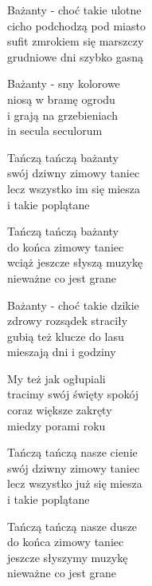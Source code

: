 \begin{text}
    Bażanty - choć takie ulotne\\
    cicho podchodzą pod miasto\\
    sufit zmrokiem się marszczy\\
    grudniowe dni szybko gasną

    Bażanty - sny kolorowe\\
    niosą w bramę ogrodu\\
    i grają na grzebieniach\\
    in secula seculorum

    Tańczą tańczą bażanty\\
    swój dziwny zimowy taniec\\
    lecz wszystko im się miesza\\
    i takie poplątane

    Tańczą tańczą bażanty\\
    do końca zimowy taniec\\
    wciąż jeszcze słyszą muzykę\\
    nieważne co jest grane

    Bażanty - choć takie dzikie\\
    zdrowy rozsądek straciły\\
    gubią też klucze do lasu\\
    mieszają dni i godziny

    My też jak ogłupiali\\
    tracimy swój święty spokój\\
    coraz większe zakręty\\
    miedzy porami roku

    Tańczą tańczą nasze cienie\\
    swój dziwny zimowy taniec\\
    lecz wszystko już się miesza\\
    i takie poplątane

    Tańczą tańczą nasze dusze\\
    do końca zimowy taniec\\
    jeszcze słyszymy muzykę\\
    nieważne co jest grane
\end{text}
\begin{chord}

\end{chord}